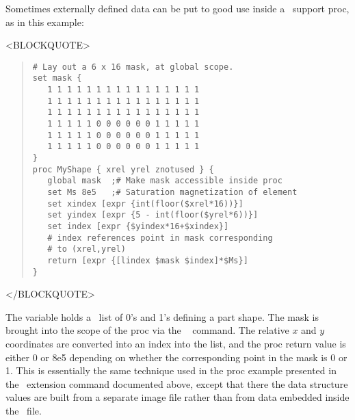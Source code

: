 %
Sometimes externally defined data can be put to good use inside a
\Tcl\ support proc, as in this example:
\begin{rawhtml}<BLOCKQUOTE>\end{rawhtml}
\begin{quote}
\begin{verbatim}
# Lay out a 6 x 16 mask, at global scope.
set mask {
   1 1 1 1 1 1 1 1 1 1 1 1 1 1 1 1
   1 1 1 1 1 1 1 1 1 1 1 1 1 1 1 1
   1 1 1 1 1 1 1 1 1 1 1 1 1 1 1 1
   1 1 1 1 1 0 0 0 0 0 0 1 1 1 1 1
   1 1 1 1 1 0 0 0 0 0 0 1 1 1 1 1
   1 1 1 1 1 0 0 0 0 0 0 1 1 1 1 1
}
proc MyShape { xrel yrel znotused } {
   global mask  ;# Make mask accessible inside proc
   set Ms 8e5   ;# Saturation magnetization of element
   set xindex [expr {int(floor($xrel*16))}]
   set yindex [expr {5 - int(floor($yrel*6))}]
   set index [expr {$yindex*16+$xindex}]
   # index references point in mask corresponding
   # to (xrel,yrel)
   return [expr {[lindex $mask $index]*$Ms}]
}
\end{verbatim}
\end{quote}
\begin{rawhtml}</BLOCKQUOTE>\end{rawhtml}
The variable  holds a \Tcl\ list of 0's and 1's defining a part
shape.  The mask is brought into the scope of the  proc via
the \Tcl\  command.  The relative $x$ and $y$ coordinates are
converted into an index into the list, and the proc return value is
either 0 or 8e5 depending on whether the corresponding point in the mask
is 0 or 1.  This is essentially the same technique used in the
 proc example presented in the
 \MIF\ extension command
documented above,
except that there the data structure values are built from a separate
image file rather than from data embedded inside the \MIF\ file.

